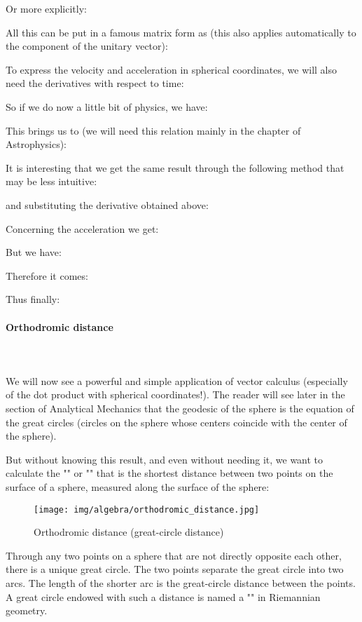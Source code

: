 	Or more explicitly:
	
	
	All this can be put in a famous matrix form as (this also applies automatically to the component of the unitary vector):
	
	To express the velocity and acceleration in spherical coordinates, we will also need the derivatives with respect to time:
	
	So if we do now a little bit of physics, we have:
	
	This brings us to (we will need this relation mainly in the chapter of Astrophysics):
	
	It is interesting that we get the same result through the following method that may be less intuitive:
	
	and substituting the derivative obtained above:
	
	Concerning the acceleration we get:
	
	But we have:
	
	Therefore it comes:
	

	Thus finally:
	
	
	\paragraph{Orthodromic distance}\mbox{}\\\\
	We will now see a powerful and simple application of vector calculus (especially of the dot product with spherical coordinates!). The reader will see later in the section of Analytical Mechanics that the geodesic of the sphere is the equation of the great circles (circles on the sphere whose centers coincide with the center of the sphere).

	But without knowing this result, and even without needing it, we want to calculate the "" or "" that is the shortest distance between two points on the surface of a sphere, measured along the surface of the sphere:
	\begin{figure}[H]
		\centering
		\texttt{[image: img/algebra/orthodromic\_distance.jpg]}
		\caption{Orthodromic distance (great-circle distance)}
	\end{figure}
	Through any two points on a sphere that are not directly opposite each other, there is a unique great circle. The two points separate the great circle into two arcs. The length of the shorter arc is the great-circle distance between the points. A great circle endowed with such a distance is named a "" in Riemannian geometry.
	
